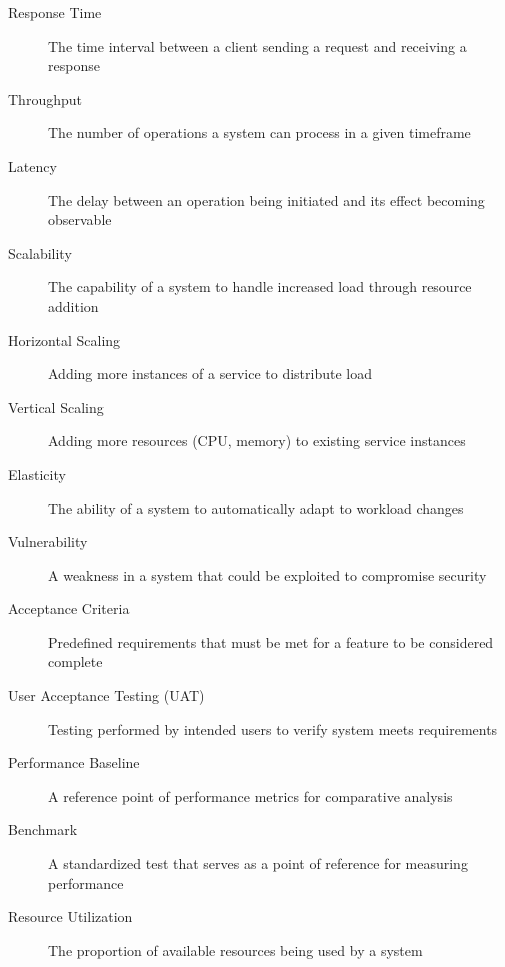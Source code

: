 \begin{description}
    \item[Response Time] The time interval between a client sending a request and receiving a response
    \item[Throughput] The number of operations a system can process in a given timeframe
    \item[Latency] The delay between an operation being initiated and its effect becoming observable
    \item[Scalability] The capability of a system to handle increased load through resource addition
    \item[Horizontal Scaling] Adding more instances of a service to distribute load
    \item[Vertical Scaling] Adding more resources (CPU, memory) to existing service instances
    \item[Elasticity] The ability of a system to automatically adapt to workload changes
    \item[Vulnerability] A weakness in a system that could be exploited to compromise security
    \item[Acceptance Criteria] Predefined requirements that must be met for a feature to be considered complete
    \item[User Acceptance Testing (UAT)] Testing performed by intended users to verify system meets requirements
    \item[Performance Baseline] A reference point of performance metrics for comparative analysis
    \item[Benchmark] A standardized test that serves as a point of reference for measuring performance
    \item[Resource Utilization] The proportion of available resources being used by a system
\end{description}